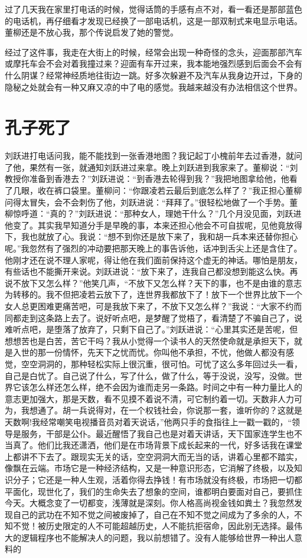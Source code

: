 \documentclass[12pt,oneside]{book}
\begin{document}
过了几天我在家里打电话的时候，觉得话筒的手感有点不对，看一看还是那部蓝色的电话机，再仔细看才发现已经换了一部电话机，这是一部双制式来电显示电话。董柳还是不放心我，那个传说启发了她的警觉。

经过了这件事，我走在大街上的时候，经常会出现一种奇怪的念头，迎面那部汽车或摩托车会不会对着我撞过来？迎面有车开过来，我本能地强烈感到后面会不会有什么阴谋？经常神经质地往街边一跳。好多次躲避不及汽车从我身边开过，下身的隐秘之处就会有一种又麻又凉的中了电的感觉。我越来越没有办法相信这个世界。


\chapter{孔子死了}

刘跃进打电话问我，能不能找到一张香港地图？我记起丁小槐前年去过香港，就问了他，果然有一张，就通知刘跃进过来拿。晚上刘跃进到我家来了。董柳说：``刘教授你准备到香港去？''刘跃进说：``到香港去轮得到我？''我把地图拿给他，他看了几眼，收在裤口袋里。董柳问：``你跟凌若云最后到底怎么样了？''我正担心董柳问得太冒失，会不会刺伤了他，刘跃进说：``拜拜了。''很轻松地做了一个手势。董柳惊呼道：``真的？''刘跃进说：``那种女人，理她干什么？''几个月没见面，刘跃进他变了。其实我早知道分手是早晚的事，本来还担心他会不可自拔呢，见他竟放得下，我也就放了心。我说：``想不到你还是放下来了，我和胡一兵本来还替你担心呢。''我忽然有了强烈的冲动要把那天晚上的事告诉他，话冲到舌尖上还是含住了。他刚才还在说不理人家呢，得让他在我们面前保持这个虚无的神话。哪怕是朋友，有些话也不能撕开来说。刘跃进说：``放下来了，连我自己都没想到能这么快。再说不放下又怎么样？''他笑几声，``不放下又怎么样？天下的事，也不是由谁的意志为转移的。我不但把凌若云放下了，连世界我都放下了！放下一个世界比放下一个女人总更困难更痛苦吧，可是我放下来了，不放下又怎么样？''我说：``大家不约而同都走到这条路上去了。说好听点吧，是梦醒了觉梧了，看清楚了不骗自己了，说难听点吧，是堕落了放弃了，只剩下自己了。''刘跃进说：``心里其实还是苦呢，但想想苦也是白苦，苦它干吗？我从小觉得一个读书人的天然使命就是承担天下，就是入世的那一份情怀，先天下之忧而忧。你叫他不承担，不忧，他做人都没有感觉，空空洞洞的，那种轻松实际上很沉重，很可怕。可忧了这么多年回过头一看，自己是白忧了。自己说了什么，写了什么，做了什么，等于没说，没写，没做。世界它该怎么样还怎么样，绝不会因为谁而走另一条路。时间之中有一种力量比人的意志更加强大，那是天数，看不见摸不着说不清，可它制约着一切。天数非人力可为，我想通了。胡一兵说得对，在一个权钱社会，你说那一套，谁听你的？这就是天数啊!我经常嘲笑电视播音员对着天说话，''他两只手的食指往上一戳一戳的，``领导是服务，干部是公仆。最近醒悟了我自己也是对着天讲话，天下国家连学生也不当真了。他们比我还潇洒，他们是在市场背景下成长起来的一代，好多话我在课堂上都讲不下去了。跟现实无关的话，空空洞洞大而无当的话，讲着心里都不踏实，像飘在云端。市场它是一种经济结构，又是一种意识形态，它消解了终极，以及知识分子；它还是一种人生观，活着你得去挣钱！有市场就没有终极，市场把一切都平面化，现世化了，我们的生命失去了想象的空间，谁都明白要面对自己，要抓住今天。大概念变了一切都变，浅薄就是深刻。你人格高尚视金钱如粪土？我忽然发现自己的武功在不知不觉之间被废掉了，自己在不知不觉之间成为了多余的人，不知不觉！被历史限定的人不可能超越历史，人不能抗拒宿命，因此别无选择。最伟大的逻辑程序也不能解决人的问题，我以前想错了。没有人能够给世界一种出人意料的
\end{document}
